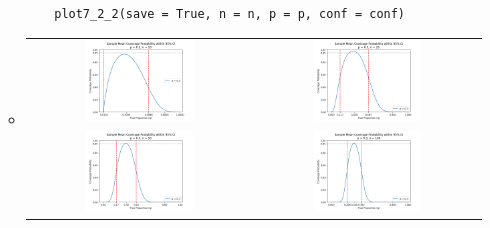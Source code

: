 \documentclass{article}
\begin{document}
\begin{enumerate}
\begin{itemize}
\begin{verbatim}
    plot7_2_2(save = True, n = n, p = p, conf = conf)
\end{verbatim}
		\item
\begin{center}
\begin{tabular}{cc}
    \includegraphics[width=0.5\textwidth]{7-Estimating_the_CDF_and_Statistical_Functionals/Ex7_2_2-10.png} &
    \includegraphics[width=0.5\textwidth]{7-Estimating_the_CDF_and_Statistical_Functionals/Ex7_2_2-25.png} \\
    \includegraphics[width=0.5\textwidth]{7-Estimating_the_CDF_and_Statistical_Functionals/Ex7_2_2-50.png} &
    \includegraphics[width=0.5\textwidth]{7-Estimating_the_CDF_and_Statistical_Functionals/Ex7_2_2-100.png}
\end{tabular}
\end{center}


\end{itemize}
\end{enumerate}
\end{document}
